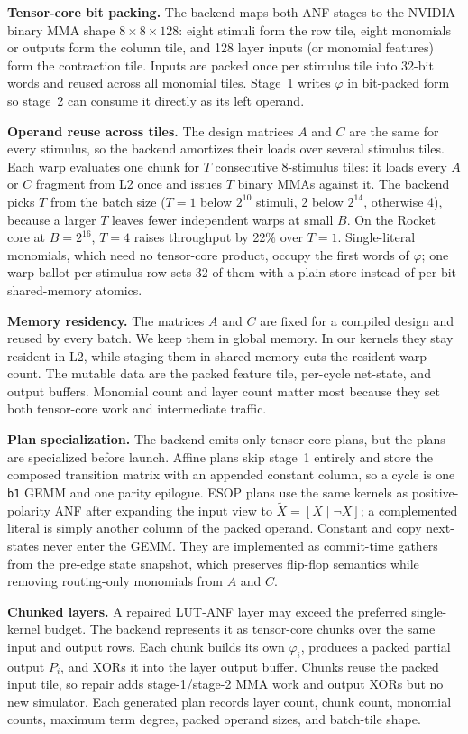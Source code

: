 \documentclass[sigconf]{acmart}
\begin{document}
\textbf{Tensor-core bit packing.} The backend maps both ANF stages to the NVIDIA binary MMA
shape $8{\times}8{\times}128$: eight stimuli form the row tile, eight monomials or outputs form the
column tile, and 128 layer inputs (or monomial features) form the contraction tile. Inputs are
packed once per stimulus tile into 32-bit words and reused across all monomial tiles. Stage~1 writes
$\varphi$ in bit-packed form so stage~2 can consume it directly as its left operand.

\textbf{Operand reuse across tiles.} The design matrices $A$ and $C$ are the same for every
stimulus, so the backend amortizes their loads over several stimulus tiles. Each warp evaluates one
chunk for $T$ consecutive 8-stimulus tiles: it loads every $A$ or $C$ fragment from L2 once and issues
$T$ binary MMAs against it. The backend picks $T$ from the batch size ($T{=}1$ below $2^{10}$ stimuli,
2 below $2^{14}$, otherwise 4), because a larger $T$ leaves fewer independent warps at small $B$. On
the Rocket core at $B=2^{16}$, $T{=}4$ raises throughput by 22\% over $T{=}1$. Single-literal
monomials, which need no tensor-core product, occupy the first words of $\varphi$; one warp ballot per
stimulus row sets 32 of them with a plain store instead of per-bit shared-memory atomics.

\textbf{Memory residency.} The matrices $A$ and $C$ are fixed for a compiled design and reused by
every batch. We keep them in global memory. In our kernels they stay resident in L2, while staging them
in shared memory cuts the resident warp count. The mutable data are the packed feature tile,
per-cycle net-state, and output buffers. Monomial count and layer count matter most because
they set both tensor-core work and intermediate traffic.

\textbf{Plan specialization.} The backend emits only tensor-core plans, but the plans are
specialized before launch. Affine plans skip stage~1 entirely and store the composed transition
matrix with an appended constant column, so a cycle is one \texttt{b1} GEMM and one parity
epilogue. ESOP plans use the same kernels as positive-polarity ANF after expanding the input view
to $\tilde X=[X\mid \lnot X]$; a complemented literal is simply another column of the packed
operand. Constant and copy next-states never enter the GEMM. They are
implemented as commit-time gathers from the pre-edge state snapshot, which preserves flip-flop
semantics while removing routing-only monomials from $A$ and $C$.

\textbf{Chunked layers.} A repaired LUT-ANF layer may exceed the preferred single-kernel budget.
The backend represents it as tensor-core chunks over the same input and output rows. Each chunk
builds its own $\varphi_i$, produces a packed partial output $P_i$, and XORs it into the layer
output buffer. Chunks reuse the packed input tile, so repair adds stage-1/stage-2 MMA work and
output XORs but no new simulator. Each generated plan records layer count, chunk count, monomial
counts, maximum term degree, packed operand sizes, and batch-tile shape.
\end{document}
